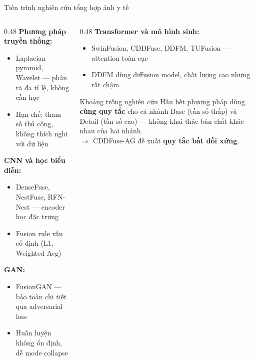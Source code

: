 \documentclass[t, aspectratio=169]{beamer}
\begin{document}
\begin{frame}{Tiến trình nghiên cứu tổng hợp ảnh y tế}
    \begin{columns}[T]
        \begin{column}{0.48\textwidth}
            \textbf{Phương pháp truyền thống:}
            \begin{itemize}\itemsep1pt\small
                \item Laplacian pyramid, Wavelet --- phân rã đa tỉ lệ, không cần học
                \item Hạn chế: tham số thủ công, không thích nghi với dữ liệu
            \end{itemize}
            \vspace{0.3em}
            \textbf{CNN và học biểu diễn:}
            \begin{itemize}\itemsep1pt\small
                \item DenseFuse, NestFuse, RFN-Nest --- encoder học đặc trưng
                \item Fusion rule vẫn cố định (L1, Weighted Avg)
            \end{itemize}
            \vspace{0.3em}
            \textbf{GAN:}
            \begin{itemize}\itemsep1pt\small
                \item FusionGAN --- bảo toàn chi tiết qua adversarial loss
                \item Huấn luyện không ổn định, dễ mode collapse
            \end{itemize}
        \end{column}
        \begin{column}{0.48\textwidth}
            \textbf{Transformer và mô hình sinh:}
            \begin{itemize}\itemsep1pt\small
                \item SwinFusion, CDDFuse, DDFM, TUFusion --- attention toàn cục
                \item DDFM dùng diffusion model, chất lượng cao nhưng rất chậm
            \end{itemize}
            \vspace{0.5em}
            \begin{alertblock}{Khoảng trống nghiên cứu}
                \small Hầu hết phương pháp dùng \textbf{cùng quy tắc} cho cả nhánh Base (tần số thấp) và Detail (tần số cao) --- không khai thác bản chất khác nhau của hai nhánh.\\[4pt]
                $\Rightarrow$ CDDFuse-AG đề xuất \textbf{quy tắc bất đối xứng}.
            \end{alertblock}
        \end{column}
    \end{columns}
\end{frame}
\end{document}
